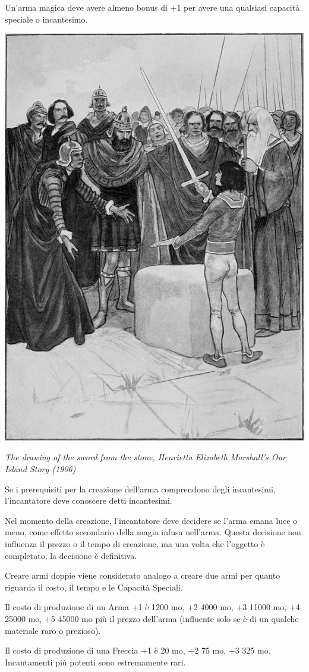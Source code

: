 \begin{multicols}{2}
	Un'arma magica deve avere almeno bonus di +1 per avere una qualsiasi capacità speciale o incantesimo.

	\medskip

	\begin{center}
		\includegraphics[width=0.6\linewidth]{immagini/exacaliburfuori.png}

		\textit{The drawing of the sword from the stone, Henrietta Elizabeth Marshall's Our Island Story (1906)}
	\end{center}

	\medskip

	Se i prerequisiti per la creazione dell'arma comprendono degli incantesimi, l'incantatore deve conoscere detti incantesimi.

	Nel momento della creazione, l'incantatore deve decidere se l'arma emana luce o meno, come effetto secondario della magia infusa nell'arma. Questa decisione non influenza il prezzo o il tempo di creazione, ma una volta che l'oggetto è completato, la decisione è definitiva.

	Creare armi doppie viene considerato analogo a creare due armi per quanto riguarda il costo, il tempo e le Capacità Speciali.

	Il costo di produzione di un Arma +1 è 1200 mo, +2 4000 mo, +3 11000 mo, +4 25000 mo, +5 45000 mo più il prezzo dell'arma (influente solo se è di un qualche materiale raro o prezioso).

	Il costo di produzione di una Freccia +1 è 20 mo, +2 75 mo, +3 325 mo. Incantamenti più potenti sono estremamente rari.


\end{multicols}
